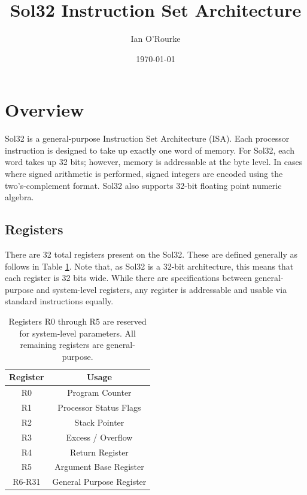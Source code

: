 \documentclass{article}
\title{Sol32 Instruction Set Architecture}
\author{Ian O'Rourke}
\date{\today \\ \titlelogoimage}
\begin{document}
\maketitle

\section{Overview}

Sol32 is a general-purpose Instruction Set Architecture (ISA). Each processor instruction is designed to take up exactly one word of memory. For Sol32, each word takes up 32 bits; however, memory is addressable at the byte level. In cases where signed arithmetic is performed, signed integers are encoded using the two's-complement format. Sol32 also supports 32-bit floating point numeric algebra.

\subsection{Registers}

There are 32 total registers present on the Sol32. These are defined generally as follows in Table \ref{table:register-setup}. Note that, as Sol32 is a 32-bit architecture, this means that each register is 32 bits wide. While there are specifications between general-purpose and system-level registers, any register is addressable and usable via standard instructions equally.

\begin{table}[h!]
    \centering
    \begin{tabular}{c|c}
        \hline
        Register & Usage \\
        \hline
        R0 & Program Counter \\
        R1 & Processor Status Flags \\
        R2 & Stack Pointer \\
        R3 & Excess / Overflow \\
        R4 & Return Register \\
        R5 & Argument Base Register \\
        R6-R31 & General Purpose Register \\
        \hline
    \end{tabular}
    \caption{Registers R0 through R5 are reserved for system-level parameters. All remaining registers are general-purpose.}
    \label{table:register-setup}
\end{table}
\end{document}
